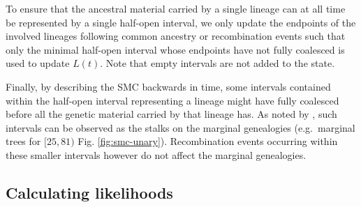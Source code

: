 \documentclass{article}
\begin{document}
To ensure that the ancestral material carried by a single lineage can at
all time be represented by a single half-open interval, we only update the
endpoints of the involved lineages following common ancestry or recombination events
such that only the minimal half-open interval whose endpoints have not fully coalesced
is used to update $L(t)$. Note that empty intervals are not added to the state.


Finally, by describing the SMC
backwards in time, some intervals contained within the half-open
interval representing a lineage might have fully coalesced before all the genetic
material carried by that lineage has. As noted by \citet{mcvean_approximating_2005},
such intervals can be observed as the stalks on the marginal genealogies (e.g.\ marginal trees
for $[25, 81)$ Fig. \ref{fig:smc-unary}). Recombination events occurring within these smaller
intervals however do not affect the marginal genealogies.



\subsection{Calculating likelihoods} \label{par:liks}
\end{document}
